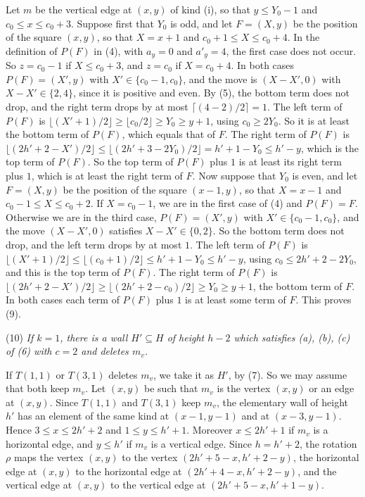 {Let $m$ be the vertical edge at $(x, y)$ of kind (i), so that $y \le Y_0 - 1$ and $c_0 \le x \le c_0 + 3$. Suppose first that $Y_0$ is odd, and let $F = (X, y)$ be the position of the square $(x, y)$, so that $X = x + 1$ and $c_0 + 1 \le X \le c_0 + 4$. In the definition of $P(F)$ in (4), with $a_y = 0$ and $a'_y = 4$, the first case does not occur. So $z = c_0 - 1$ if $X \le c_0 + 3$, and $z = c_0$ if $X = c_0 + 4$. In both cases $P(F) = (X', y)$ with $X' \in \{c_0 - 1, c_0\}$, and the move is $(X - X', 0)$ with $X - X' \in \{2, 4\}$, since it is positive and even. By (5), the bottom term does not drop, and the right term drops by at most $\lceil (4 - 2)/2 \rceil = 1$. The left term of $P(F)$ is $\lfloor (X' + 1)/2 \rfloor \ge \lfloor c_0/2 \rfloor \ge Y_0 \ge y + 1$, using $c_0 \ge 2Y_0$. So it is at least the bottom term of $P(F)$, which equals that of $F$. The right term of $P(F)$ is $\lfloor (2h' + 2 - X')/2 \rfloor \le \lfloor (2h' + 3 - 2Y_0)/2 \rfloor = h' + 1 - Y_0 \le h' - y$, which is the top term of $P(F)$. So the top term of $P(F)$ plus $1$ is at least its right term plus $1$, which is at least the right term of $F$. Now suppose that $Y_0$ is even, and let $F = (X, y)$ be the position of the square $(x - 1, y)$, so that $X = x - 1$ and $c_0 - 1 \le X \le c_0 + 2$. If $X = c_0 - 1$, we are in the first case of (4) and $P(F) = F$. Otherwise we are in the third case, $P(F) = (X', y)$ with $X' \in \{c_0 - 1, c_0\}$, and the move $(X - X', 0)$ satisfies $X - X' \in \{0, 2\}$. So the bottom term does not drop, and the left term drops by at most $1$. The left term of $P(F)$ is $\lfloor (X' + 1)/2 \rfloor \le \lfloor (c_0 + 1)/2 \rfloor \le h' + 1 - Y_0 \le h' - y$, using $c_0 \le 2h' + 2 - 2Y_0$, and this is the top term of $P(F)$. The right term of $P(F)$ is $\lfloor (2h' + 2 - X')/2 \rfloor \ge \lfloor (2h' + 2 - c_0)/2 \rfloor \ge Y_0 \ge y + 1$, the bottom term of $F$. In both cases each term of $P(F)$ plus $1$ is at least some term of $F$. This proves (9).

\hspace*{12pt}(10) \textit{If $k = 1$, there is a wall $H' \subseteq H$ of height $h - 2$ which satisfies (a), (b), (c) of (6) with $c = 2$ and deletes $m_v$.}

If $T(1, 1)$ or $T(3, 1)$ deletes $m_v$, we take it as $H'$, by (7). So we may assume that both keep $m_v$. Let $(x, y)$ be such that $m_v$ is the vertex $(x, y)$ or an edge at $(x, y)$. Since $T(1, 1)$ and $T(3, 1)$ keep $m_v$, the elementary wall of height $h'$ has an element of the same kind at $(x - 1, y - 1)$ and at $(x - 3, y - 1)$. Hence $3 \le x \le 2h' + 2$ and $1 \le y \le h' + 1$. Moreover $x \le 2h' + 1$ if $m_v$ is a horizontal edge, and $y \le h'$ if $m_v$ is a vertical edge. Since $h = h' + 2$, the rotation $\rho$ maps the vertex $(x, y)$ to the vertex $(2h' + 5 - x, h' + 2 - y)$, the horizontal edge at $(x, y)$ to the horizontal edge at $(2h' + 4 - x, h' + 2 - y)$, and the vertical edge at $(x, y)$ to the vertical edge at $(2h' + 5 - x, h' + 1 - y)$.

}
